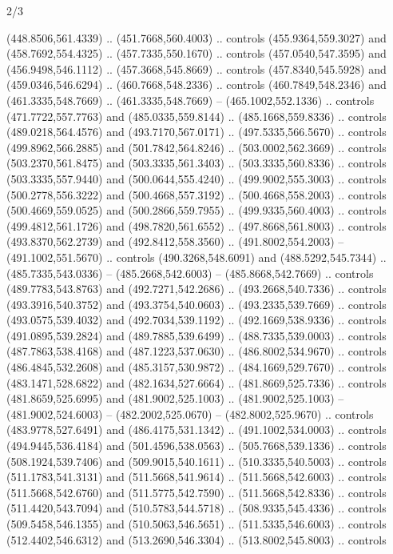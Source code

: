 \begin{flagdescription}{2/3}
\begin{scope}[xshift=0.5\flaglength,yshift=0.5\flagwidth,scale=\flagwidth/525.28]
\begin{scope}[y=0.1mm, x=0.1mm, yscale=-1,shift={(-381.5,-404)}]
\begin{scope}[shift={(5.25001,4.53053)},miter limit=4.00,line width=0.800\lw]
  (448.8506,561.4339) .. (451.7668,560.4003) .. controls (455.9364,559.3027) and
  (458.7692,554.4325) .. (457.7335,550.1670) .. controls (457.0540,547.3595) and
  (456.9498,546.1112) .. (457.3668,545.8669) .. controls (457.8340,545.5928) and
  (459.0346,546.6294) .. (460.7668,548.2336) .. controls (460.7849,548.2346) and
  (461.3335,548.7669) .. (461.3335,548.7669) -- (465.1002,552.1336) .. controls
  (471.7722,557.7763) and (485.0335,559.8144) .. (485.1668,559.8336) .. controls
  (489.0218,564.4576) and (493.7170,567.0171) .. (497.5335,566.5670) .. controls
  (499.8962,566.2885) and (501.7842,564.8246) .. (503.0002,562.3669) .. controls
  (503.2370,561.8475) and (503.3335,561.3403) .. (503.3335,560.8336) .. controls
  (503.3335,557.9440) and (500.0644,555.4240) .. (499.9002,555.3003) .. controls
  (500.2778,556.3222) and (500.4668,557.3192) .. (500.4668,558.2003) .. controls
  (500.4669,559.0525) and (500.2866,559.7955) .. (499.9335,560.4003) .. controls
  (499.4812,561.1726) and (498.7820,561.6552) .. (497.8668,561.8003) .. controls
  (493.8370,562.2739) and (492.8412,558.3560) .. (491.8002,554.2003) --
  (491.1002,551.5670) .. controls (490.3268,548.6091) and (488.5292,545.7344) ..
  (485.7335,543.0336) -- (485.2668,542.6003) -- (485.8668,542.7669) .. controls
  (489.7783,543.8763) and (492.7271,542.2686) .. (493.2668,540.7336) .. controls
  (493.3916,540.3752) and (493.3754,540.0603) .. (493.2335,539.7669) .. controls
  (493.0575,539.4032) and (492.7034,539.1192) .. (492.1669,538.9336) .. controls
  (491.0895,539.2824) and (489.7885,539.6499) .. (488.7335,539.0003) .. controls
  (487.7863,538.4168) and (487.1223,537.0630) .. (486.8002,534.9670) .. controls
  (486.4845,532.2608) and (485.3157,530.9872) .. (484.1669,529.7670) .. controls
  (483.1471,528.6822) and (482.1634,527.6664) .. (481.8669,525.7336) .. controls
  (481.8659,525.6995) and (481.9002,525.1003) .. (481.9002,525.1003) --
  (481.9002,524.6003) -- (482.2002,525.0670) -- (482.8002,525.9670) .. controls
  (483.9778,527.6491) and (486.4175,531.1342) .. (491.1002,534.0003) .. controls
  (494.9445,536.4184) and (501.4596,538.0563) .. (505.7668,539.1336) .. controls
  (508.1924,539.7406) and (509.9015,540.1611) .. (510.3335,540.5003) .. controls
  (511.1783,541.3131) and (511.5668,541.9614) .. (511.5668,542.6003) .. controls
  (511.5668,542.6760) and (511.5775,542.7590) .. (511.5668,542.8336) .. controls
  (511.4420,543.7094) and (510.5783,544.5718) .. (508.9335,545.4336) .. controls
  (509.5458,546.1355) and (510.5063,546.5651) .. (511.5335,546.6003) .. controls
  (512.4402,546.6312) and (513.2690,546.3304) .. (513.8002,545.8003) .. controls

\end{scope}
\end{scope}
\end{scope}
\end{flagdescription}
